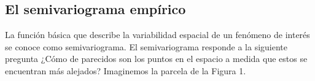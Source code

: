 \documentclass{article}
\begin{document}
\subsection{}

\subsection{El semivariograma empírico } La función básica que describe la variabilidad espacial de un fenómeno de interés se conoce como semivariograma. El
semivariograma responde a la siguiente pregunta ¿Cómo de parecidos son los puntos en el espacio a medida que estos se
encuentran más alejados? Imaginemos la parcela de la Figura 1.



\end{document}
